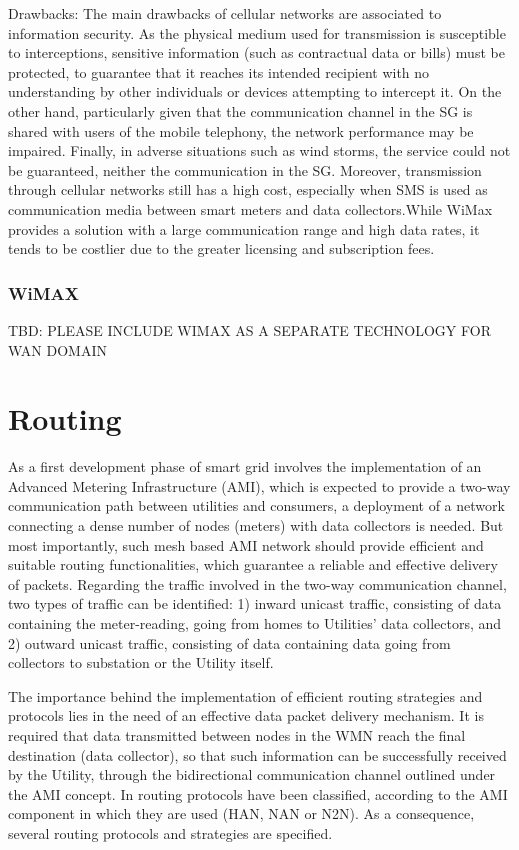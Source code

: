 \documentclass[11pt,draftclsnofoot,onecolumn]{IEEEtran}
\begin{document}
Drawbacks: The main drawbacks of cellular networks are associated to information security. As the physical medium used for transmission is susceptible to interceptions, sensitive information (such as contractual data or bills) must be protected, to guarantee that it reaches its intended recipient with no understanding by other individuals or devices attempting to intercept it. On the other hand, particularly given that the communication channel in the SG is shared with users of the mobile telephony, the network performance may be impaired. Finally, in adverse situations such as wind storms, the service could not be guaranteed, neither the communication in the SG. Moreover, transmission through cellular networks still has a high cost, especially when SMS is used as communication media between smart meters and data collectors.While WiMax provides a solution with a large communication range and high data rates, it tends to be costlier due to the greater licensing and subscription fees. 


\subsubsection{WiMAX}\label{tech::wimax}
TBD: PLEASE INCLUDE WIMAX AS A SEPARATE TECHNOLOGY FOR WAN DOMAIN


\section{Routing} \label{routing}

As a first development phase of smart grid involves the implementation of an Advanced Metering Infrastructure (AMI), which is expected to provide a two-way communication path between utilities and consumers, a deployment of a network connecting a dense number of nodes (meters) with data collectors is needed. But most importantly, such mesh based AMI network should provide efficient and suitable routing functionalities, which guarantee a reliable and effective delivery of packets. Regarding the traffic involved in the two-way communication channel, two types of traffic can be identified: 1) inward unicast traffic, consisting of data containing the meter-reading, going from homes to Utilities’ data collectors, and 2) outward unicast traffic, consisting of data containing data going from collectors to substation or the Utility itself. 

The importance behind the implementation of efficient routing strategies and protocols lies in the need of an effective data packet delivery mechanism. It is required that data transmitted between nodes in the WMN reach the final destination (data collector), so that such information can be successfully received by the Utility, through the bidirectional communication channel outlined under the AMI concept. In \cite{Sabbah2014} routing protocols have been classified, according to the AMI component in which they are used (HAN, NAN or N2N). As a consequence, several routing protocols and strategies are specified.
\end{document}

